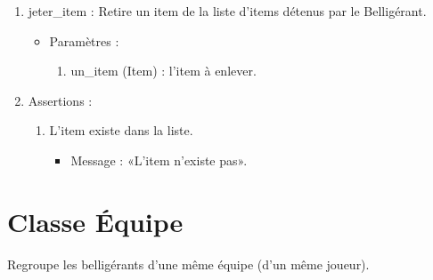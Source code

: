 \documentclass[12pt,pdftex,oneside]{article}
\begin{document}
\begin{itemize}
\begin{enumerate}
    \item jeter\_item : Retire un item de la liste d'items détenus par le Belligérant.
      \begin{itemize}
      \item Paramètres : 
        \begin{enumerate}
        \item un\_item (Item) : l'item à enlever. 
        \end{enumerate}
      \end{itemize}
      \item Assertions : 
        \begin{enumerate}
            \item L'item existe dans la liste.
            \begin{itemize}
              \item Message : «L'item n'existe pas».
            \end{itemize}

        \end{enumerate}
    \end{enumerate}
  \end{itemize}

  \section {Classe Équipe}

  Regroupe les belligérants d'une même équipe (d'un même joueur).
\end{document}
